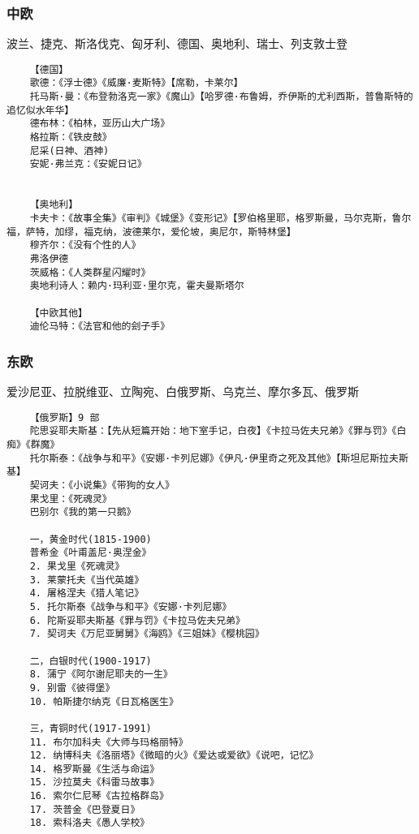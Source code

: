 \documentclass[UTF8]{../../RepresentationUniverse}
\begin{document}
\subsubsection{中欧}
波兰、捷克、斯洛伐克、匈牙利、德国、奥地利、瑞士、列支敦士登
\begin{lstlisting}
    【德国】
    歌德：《浮士德》《威廉·麦斯特》【席勒，卡莱尔】
    托马斯·曼：《布登勃洛克一家》《魔山》【哈罗德·布鲁姆，乔伊斯的尤利西斯，普鲁斯特的追忆似水年华】
    德布林：《柏林，亚历山大广场》
    格拉斯：《铁皮鼓》
    尼采(日神、酒神) 
    安妮·弗兰克：《安妮日记》


    【奥地利】
    卡夫卡：《故事全集》《审判》《城堡》《变形记》【罗伯格里耶，格罗斯曼，马尔克斯，鲁尔福，萨特，加缪，福克纳，波德莱尔，爱伦坡，奥尼尔，斯特林堡】
    穆齐尔：《没有个性的人》
    弗洛伊德
    茨威格：《人类群星闪耀时》
    奥地利诗人：赖内·玛利亚·里尔克，霍夫曼斯塔尔

    【中欧其他】
    迪伦马特：《法官和他的刽子手》
\end{lstlisting}



\subsubsection{东欧}
爱沙尼亚、拉脱维亚、立陶宛、白俄罗斯、乌克兰、摩尔多瓦、俄罗斯
\begin{lstlisting}
    【俄罗斯】9 部 
    陀思妥耶夫斯基：【先从短篇开始：地下室手记，白夜】《卡拉马佐夫兄弟》《罪与罚》《白痴》《群魔》
    托尔斯泰：《战争与和平》《安娜·卡列尼娜》《伊凡·伊里奇之死及其他》【斯坦尼斯拉夫斯基】
    契诃夫：《小说集》《带狗的女人》
    果戈里：《死魂灵》
    巴别尔《我的第一只鹅》

    一，黄金时代(1815-1900) 
    普希金《叶甫盖尼·奥涅金》
    2. 果戈里《死魂灵》
    3. 莱蒙托夫《当代英雄》
    4. 屠格涅夫《猎人笔记》
    5. 托尔斯泰《战争与和平》《安娜·卡列尼娜》
    6. 陀斯妥耶夫斯基《罪与罚》《卡拉马佐夫兄弟》
    7. 契诃夫《万尼亚舅舅》《海鸥》《三姐妹》《樱桃园》
    
    二，白银时代(1900-1917) 
    8. 蒲宁《阿尔谢尼耶夫的一生》
    9. 别雷《彼得堡》
    10. 帕斯捷尔纳克《日瓦格医生》
    
    三，青铜时代(1917-1991) 
    11. 布尔加科夫《大师与玛格丽特》
    12. 纳博科夫《洛丽塔》《微暗的火》《爱达或爱欲》《说吧，记忆》
    14. 格罗斯曼《生活与命运》
    15. 沙拉莫夫《科雷马故事》
    16. 索尔仁尼琴《古拉格群岛》
    17. 茨普金《巴登夏日》
    18. 索科洛夫《愚人学校》




\end{lstlisting}
\end{document}
